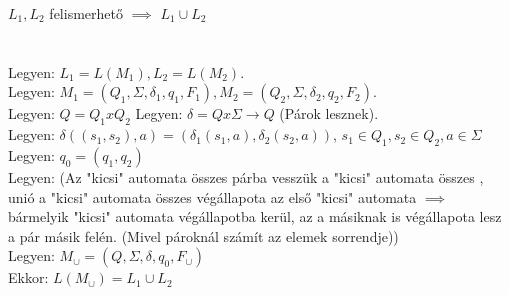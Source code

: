 \begin{frame}
\begin{tcolorbox}[title={Tétel: Felismerhető nyelvek egyesítése}]
$L_1, L_2$ felismerhető $\implies$ $L_1 \cup L_2$\\
\tcblower
\msmallskip
\underline{}\\
\mmedskip
\\
Legyen: $L_1 = L(M_1), L_2 = L(M_2)$.\\
Legyen: $M_1 = (Q_1, \Sigma , {\delta}_1, q_1, F_1), M_2 = (Q_2, \Sigma , {\delta}_2, q_2, F_2)$.\\
Legyen: $Q = Q_1 x Q_2$
Legyen: $\delta = Q x \Sigma \rightarrow Q$ (Párok lesznek).\\
Legyen: $\delta((s_1, s_2), a) = ({\delta}_1(s_1, a), {\delta}_2(s_2, a))$, $s_1 \in Q_1, s_2 \in Q_2, a \in \Sigma$\\
\mbigskip
Legyen: $q_0 = (q_1, q_2)$\\
Legyen: \underline{} (Az  "kicsi" automata összes  párba vesszük a  "kicsi" automata összes , unió a  "kicsi" automata összes végállapota az első "kicsi" automata  $\implies$ bármelyik "kicsi" automata végállapotba kerül, az a másiknak is végállapota lesz a pár másik felén. (Mivel pároknál számít az elemek sorrendje))\\
\msmallskip
Legyen: $M_{\cup} = (Q, \Sigma , \delta , q_0, F_{\cup})$\\
\mbigskip
Ekkor: \underline{$L(M_{\cup}) = L_1 \cup L_2$}\\
\end{tcolorbox}

\end{frame}

